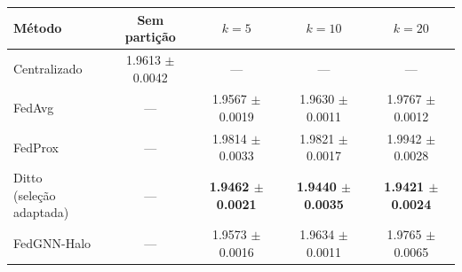 
\begin{tabular}{lcccc}
\toprule
Método & Sem partição & $k=5$ & $k=10$ & $k=20$ \\
\midrule
Centralizado & \num{1.9613} $\pm$ \num{0.0042} & --- & --- & --- \\
\midrule
FedAvg & --- & \num{1.9567} $\pm$ \num{0.0019} & \num{1.9630} $\pm$ \num{0.0011} & \num{1.9767} $\pm$ \num{0.0012} \\
FedProx & --- & \num{1.9814} $\pm$ \num{0.0033} & \num{1.9821} $\pm$ \num{0.0017} & \num{1.9942} $\pm$ \num{0.0028} \\
\shortstack[l]{Ditto\\(seleção adaptada)} & --- & \textbf{\boldmath\sisetup{mode=text,detect-weight=true}\num{1.9462} $\pm$ \num{0.0021}} & \textbf{\boldmath\sisetup{mode=text,detect-weight=true}\num{1.9440} $\pm$ \num{0.0035}} & \textbf{\boldmath\sisetup{mode=text,detect-weight=true}\num{1.9421} $\pm$ \num{0.0024}} \\
FedGNN-Halo & --- & \num{1.9573} $\pm$ \num{0.0016} & \num{1.9634} $\pm$ \num{0.0011} & \num{1.9765} $\pm$ \num{0.0065} \\
\bottomrule
\end{tabular}
